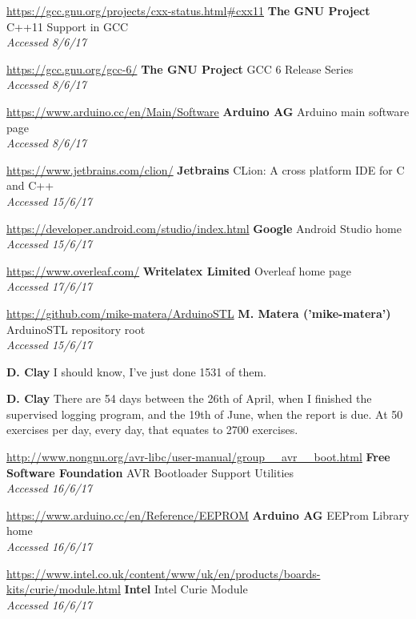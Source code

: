 \documentclass[a4paper]{article}
\begin{document}
\begin{thebibliography}{9}
\url{https://gcc.gnu.org/projects/cxx-status.html#cxx11}
\textbf{The GNU Project}
C++11 Support in GCC
\\\textit{Accessed 8/6/17}

\url{https://gcc.gnu.org/gcc-6/}
\textbf{The GNU Project}
GCC 6 Release Series
\\\textit{Accessed 8/6/17}

\url{https://www.arduino.cc/en/Main/Software}
\textbf{Arduino AG}
Arduino main software page
\\\textit{Accessed 8/6/17}

\url{https://www.jetbrains.com/clion/}
\textbf{Jetbrains}
CLion: A cross platform IDE for C and C++
\\\textit{Accessed 15/6/17}

\url{https://developer.android.com/studio/index.html}
\textbf{Google}
Android Studio home
\\\textit{Accessed 15/6/17}

\url{https://www.overleaf.com/}
\textbf{Writelatex Limited}
Overleaf home page
\\\textit{Accessed 17/6/17}


\url{https://github.com/mike-matera/ArduinoSTL}
\textbf{M. Matera ('mike-matera')}
ArduinoSTL repository root
\\\textit{Accessed 15/6/17}

\textbf{D. Clay}
I should know, I've just done 1531 of them.

\textbf{D. Clay}
There are 54 days between the 26th of April, when I finished the supervised logging program, and the 19th of June, when the report is due. At 50 exercises per day, every day, that equates to 2700 exercises.


\url{http://www.nongnu.org/avr-libc/user-manual/group__avr__boot.html}
\textbf{Free Software Foundation}
AVR Bootloader Support Utilities
\\\textit{Accessed 16/6/17}

\url{https://www.arduino.cc/en/Reference/EEPROM}
\textbf{Arduino AG}
EEProm Library home
\\\textit{Accessed 16/6/17}

\url{https://www.intel.co.uk/content/www/uk/en/products/boards-kits/curie/module.html}
\textbf{Intel}
Intel Curie Module
\\\textit{Accessed 16/6/17}

\end{thebibliography}
\end{document}
